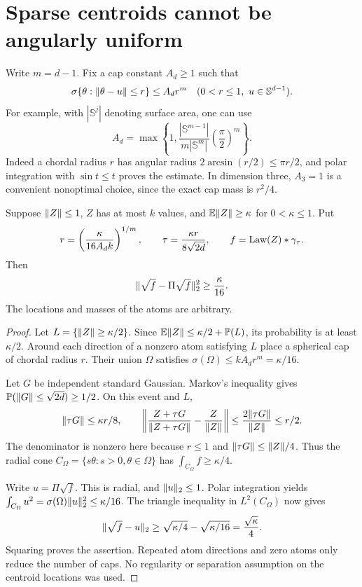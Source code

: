\section{Sparse centroids cannot be angularly uniform}\label{sec:sparse}
Write $m=d-1$. Fix a cap constant $A_d\ge1$ such that
\begin{equation}\label{eq:cap}
 \sigma\{\theta:\lVert\theta-u\rVert\le r\}\le A_dr^m
 \quad(0<r\le1,\ u\in\mathbb S^{d-1}).
\end{equation}
For example, with $|\mathbb S^j|$ denoting surface area, one can use
\[
 A_d=\max\left\{1,
 \frac{|\mathbb S^{m-1}|}{m|\mathbb S^m|}
          \left(\frac\pi2\right)^m\right\}.
\]
Indeed a chordal radius $r$ has angular radius
$2\arcsin(r/2)\le\pi r/2$, and polar integration with $\sin t\le t$
proves the estimate. In dimension three, $A_3=1$ is a convenient
nonoptimal choice, since the exact cap mass is $r^2/4$.

\begin{lemma}
\label{lem:sparse-root}
Suppose $\lVert Z\rVert\le1$, $Z$ has at most $k$ values, and
$\mathbb E\lVert Z\rVert\ge\kappa$ for $0<\kappa\le1$. Put
\begin{equation}\label{eq:smoothing-scale}
 r=\left(\frac{\kappa}{16A_dk}\right)^{1/m},\qquad
 \tau=\frac{\kappa r}{8\sqrt{2d}},\qquad
 f=\operatorname{Law}(Z)*\gamma_\tau.
\end{equation}
Then
\begin{equation}\label{eq:sparse-root}
 \lVert\sqrt f-\Pi\sqrt f\rVert_2^2\ge\frac{\kappa}{16}.
\end{equation}
The locations and masses of the atoms are arbitrary.
\end{lemma}
\begin{proof}
Let $L=\{\lVert Z\rVert\ge\kappa/2\}$. Since
$\mathbb E\lVert Z\rVert\le\kappa/2+\mathbb P(L)$, its probability is at least $\kappa/2$.
Around each direction of a nonzero atom satisfying $L$ place a spherical
cap of chordal radius $r$. Their union $\Omega$ satisfies
$\sigma(\Omega)\le kA_dr^m=\kappa/16$.

Let $G$ be independent standard Gaussian. Markov's inequality gives
$\mathbb P(\lVert G\rVert\le\sqrt{2d})\ge1/2$. On this event and $L$,
\[
 \lVert\tau G\rVert\le\kappa r/8,
 \qquad
 \left\|\frac{Z+\tau G}{\lVert Z+\tau G\rVert}-
              \frac{Z}{\lVert Z\rVert}\right\|
 \le\frac{2\lVert\tau G\rVert}{\lVert Z\rVert}\le r/2.
\]
The denominator is nonzero here because $r\le1$ and
$\lVert\tau G\rVert\le\lVert Z\rVert/4$. Thus the radial cone
$C_\Omega=\{s\theta:s>0,\theta\in\Omega\}$ has
$\int_{C_\Omega}f\ge\kappa/4$.

Write $u=\Pi\sqrt f$. This is radial, and $\lVert u\rVert_2\le1$.
Polar integration yields
$\int_{C_\Omega}u^2=\sigma(\Omega)\lVert u\rVert_2^2\le\kappa/16$.
The triangle inequality in $L^2(C_\Omega)$ now gives
\[
 \lVert\sqrt f-u\rVert_2
 \ge\sqrt{\kappa/4}-\sqrt{\kappa/16}=\frac{\sqrt\kappa}{4}.
\]
Squaring proves the assertion. Repeated atom directions and zero atoms
only reduce the number of caps. No regularity or separation assumption
on the centroid locations was used.
\end{proof}


